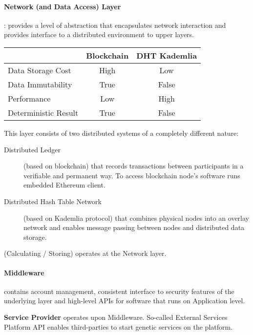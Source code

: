 \paragraph*{Network (and Data Access) Layer}: provides a level of abstraction that encapsulates network interaction and provides interface to a distributed environment to upper layers.

\begin{table}[H] \centering
  \begin{tabular}{l|c|c} &  Blockchain & DHT Kademlia \\ \hline
   Data Storage Cost     &     High    &     Low      \\
   Data Immutability     &     True    &     False    \\
   Performance           &     Low     &     High     \\
   Deterministic Result  &     True    &     False    \\
  \end{tabular}
\end{table}

This layer consists of two distributed systems of a completely different nature:
\begin{description}
  \item [Distributed Ledger] (based on blockchain) that records transactions between participants in a verifiable and permanent way. To access blockchain node's software runs embedded Ethereum client.
  \item [Distributed Hash Table Network] (based on Kademlia protocol) that combines physical nodes into an overlay network and enables message passing between nodes and distributed data storage.
\end{description}


\begin{note}[ROLE]
  (Calculating / Storing) \Node operates at the Network layer.
\end{note}


\paragraph*{Middleware} contains account management, consistent interface to security features of the underlying layer and high-level APIs for software that runs on Application level.

\begin{note}[ROLE]
  \textbf{Service Provider} operates upon Middleware. So-called External Services Platform API enables third-parties to start genetic services on the platform.
\end{note}


